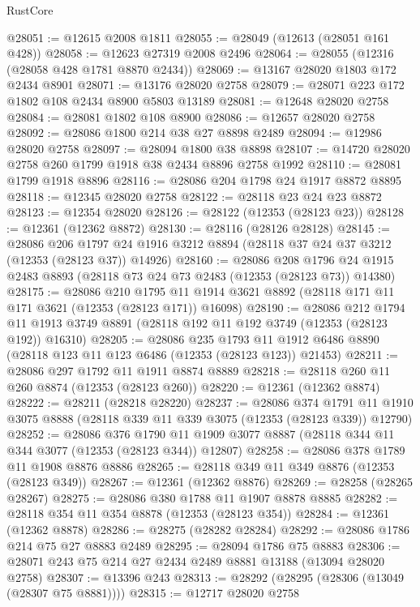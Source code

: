 \begin{lexlean}{RustCore}
\begin{coremodule}
@28051 := @12615 @2008 @1811
@28055 := @28049 (@12613 (@28051 @161 @428))
@28058 := @12623 @27319 @2008 @2496
@28064 := @28055 (@12316 (@28058 @428 @1781 @8870 @2434))
@28069 := @13167 @28020 @1803 @172 @2434 @8901
@28071 := @13176 @28020 @2758
@28079 := @28071 @223 @172 @1802 @108 @2434 @8900 @5803 @13189
@28081 := @12648 @28020 @2758
@28084 := @28081 @1802 @108 @8900
@28086 := @12657 @28020 @2758
@28092 := @28086 @1800 @214 @38 @27 @8898 @2489
@28094 := @12986 @28020 @2758
@28097 := @28094 @1800 @38 @8898
@28107 := @14720 @28020 @2758 @260 @1799 @1918 @38 @2434 @8896 @2758 @1992
@28110 := @28081 @1799 @1918 @8896
@28116 := @28086 @204 @1798 @24 @1917 @8872 @8895
@28118 := @12345 @28020 @2758
@28122 := @28118 @23 @24 @23 @8872
@28123 := @12354 @28020
@28126 := @28122 (@12353 (@28123 @23))
@28128 := @12361 (@12362 @8872)
@28130 := @28116 (@28126 @28128)
@28145 := @28086
    @206
    @1797
    @24
    @1916
    @3212
    @8894
    (@28118 @37 @24 @37 @3212 (@12353 (@28123 @37)) @14926)
@28160 := @28086
    @208
    @1796
    @24
    @1915
    @2483
    @8893
    (@28118 @73 @24 @73 @2483 (@12353 (@28123 @73)) @14380)
@28175 := @28086
    @210
    @1795
    @11
    @1914
    @3621
    @8892
    (@28118 @171 @11 @171 @3621 (@12353 (@28123 @171)) @16098)
@28190 := @28086
    @212
    @1794
    @11
    @1913
    @3749
    @8891
    (@28118 @192 @11 @192 @3749 (@12353 (@28123 @192)) @16310)
@28205 := @28086
    @235
    @1793
    @11
    @1912
    @6486
    @8890
    (@28118 @123 @11 @123 @6486 (@12353 (@28123 @123)) @21453)
@28211 := @28086 @297 @1792 @11 @1911 @8874 @8889
@28218 := @28118 @260 @11 @260 @8874 (@12353 (@28123 @260))
@28220 := @12361 (@12362 @8874)
@28222 := @28211 (@28218 @28220)
@28237 := @28086
    @374
    @1791
    @11
    @1910
    @3075
    @8888
    (@28118 @339 @11 @339 @3075 (@12353 (@28123 @339)) @12790)
@28252 := @28086
    @376
    @1790
    @11
    @1909
    @3077
    @8887
    (@28118 @344 @11 @344 @3077 (@12353 (@28123 @344)) @12807)
@28258 := @28086 @378 @1789 @11 @1908 @8876 @8886
@28265 := @28118 @349 @11 @349 @8876 (@12353 (@28123 @349))
@28267 := @12361 (@12362 @8876)
@28269 := @28258 (@28265 @28267)
@28275 := @28086 @380 @1788 @11 @1907 @8878 @8885
@28282 := @28118 @354 @11 @354 @8878 (@12353 (@28123 @354))
@28284 := @12361 (@12362 @8878)
@28286 := @28275 (@28282 @28284)
@28292 := @28086 @1786 @214 @75 @27 @8883 @2489
@28295 := @28094 @1786 @75 @8883
@28306 := @28071 @243 @75 @214 @27 @2434 @2489 @8881 @13188 (@13094 @28020 @2758)
@28307 := @13396 @243
@28313 := @28292 (@28295 (@28306 (@13049 (@28307 @75 @8881))))
@28315 := @12717 @28020 @2758

\end{coremodule}
\end{lexlean}
